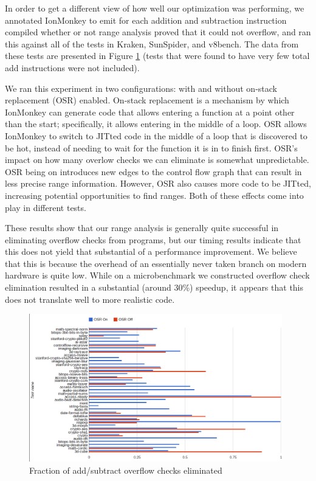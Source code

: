 \documentclass{article}
\begin{document}
In order to get a different view of how well our optimization was
performing, we annotated IonMonkey to emit for each addition and subtraction
instruction compiled whether or not range analysis proved that it
could not overflow, and ran this against all of the tests in Kraken,
SunSpider, and v8bench. The data from these tests are presented in Figure
\ref{fig:count} (tests that were found to have very few total add
instructions were not included).

We ran this experiment in two configurations: with and without
on-stack replacement (OSR) enabled. On-stack replacement is a
mechanism by which IonMonkey can generate code that allows entering a
function at a point other than the start; specifically, it allows
entering in the middle of a loop. OSR allows IonMonkey to switch to
JITted code in the middle of a loop that is discovered to be hot,
instead of needing to wait for the function it is in to finish
first. OSR's impact on how many overlow checks we can eliminate is
somewhat unpredictable. OSR being on introduces new edges to the
control flow graph that can result in less precise range
information. However, OSR also causes more code to be JITted,
increasing potential opportunities to find ranges. Both of these
effects come into play in different tests. 

These results show that our range analysis is generally quite
successful in eliminating overflow checks from programs, but our
timing results indicate that this does not yield that substantial of a
performance improvement. We believe that this is because the overhead
of an essentially never taken branch on modern hardware is quite
low. While on a microbenchmark we constructed overflow check
elimination resulted in a substantial (around 30\%) speedup, it appears that
this does not translate well to more realistic code.

\begin{figure}[!ht]
\centering
\includegraphics[width=0.98\textwidth]{counts_graph.png}
\caption{Fraction of add/subtract overflow checks eliminated}
\label{fig:count}
\end{figure}
\end{document}

